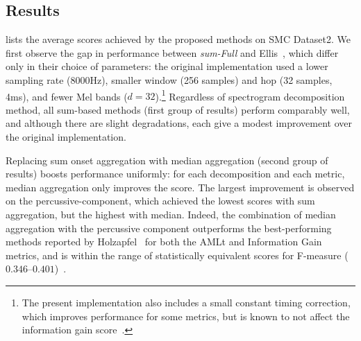 \documentclass{article}
\begin{document}
\subsection{Results}

 lists the average scores achieved by the proposed methods on
SMC Dataset2. 
We first observe the gap in performance between \emph{sum-Full} and 
Ellis~\cite{ellis2007beat}, which differ only in their choice of parameters: the 
original implementation used a lower sampling rate (8000Hz), smaller window (256 samples) 
and hop (32 samples, 4ms), and fewer Mel bands ($d=32$).\footnote{The present
implementation also includes a small constant timing correction, which improves 
performance for some metrics, but is known to not affect the information gain
score~\cite{davies2009evaluation}.}
Regardless of spectrogram decomposition method, all sum-based methods (first group of 
results) perform comparably well, and although there are slight degradations, each give 
a modest improvement over the original implementation.

Replacing sum onset aggregation with median aggregation (second group of results)
boosts performance uniformly: for each decomposition and each metric, median
aggregation only improves the score.  The largest improvement is observed on the
percussive-component, which achieved the lowest scores with sum aggregation, but the
highest with median. Indeed, the combination of median aggregation with the percussive
component outperforms the best-performing methods reported by Holzapfel~\etal{} for both 
the AMLt and Information Gain metrics, and is within the range of statistically 
equivalent scores for F-measure ($0.346$--$0.401$)~\cite{holzapfel2012}.
\end{document}
